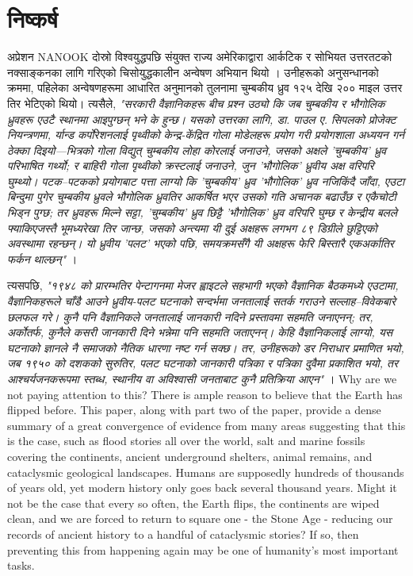 \documentclass[10pt,twocolumn,letterpaper]{article}
\begin{document}
\section{निष्कर्ष}

अप्रेशन NANOOK दोस्रो विश्वयुद्धपछि संयुक्त राज्य अमेरिकाद्वारा आर्कटिक र सोभियत उत्तरतटको नक्साङ्कनका लागि गरिएको चिसोयुद्धकालीन अन्वेषण अभियान थियो \cite{137}। उनीहरूको अनुसन्धानको क्रममा, पहिलेका अन्वेषणहरूमा आधारित अनुमानको तुलनामा चुम्बकीय ध्रुव १२५ देखि २०० माइल उत्तर तिर भेटिएको थियो। त्यसैले, \textit{"सरकारी वैज्ञानिकहरू बीच प्रश्न उठ्यो कि जब चुम्बकीय र भौगोलिक ध्रुवहरू एउटै स्थानमा आइपुग्छन् भने के हुन्छ। यसको उत्तरका लागि, डा. पाउल ए. सिपलको प्रोजेक्ट नियन्त्रणमा, र्यान्ड कर्पोरेशनलाई पृथ्वीको केन्द्र-केंद्रित गोला मोडेलहरू प्रयोग गरी प्रयोगशाला अध्ययन गर्न ठेक्का दिइयो—भित्रको गोला विद्युत् चुम्बकीय लोहा कोरलाई जनाउने, जसको अक्षले 'चुम्बकीय' ध्रुव परिभाषित गर्थ्यो; र बाहिरी गोला पृथ्वीको क्रस्टलाई जनाउने, जुन 'भौगोलिक' ध्रुवीय अक्ष वरिपरि घुम्थ्यो। पटक–पटकको प्रयोगबाट पत्ता लाग्यो कि 'चुम्बकीय' ध्रुव 'भौगोलिक' ध्रुव नजिकिंदै जाँदा, एउटा बिन्दुमा पुगेर चुम्बकीय ध्रुवले भौगोलिक ध्रुवतिर आकर्षित भएर उसको गति अचानक बढाउँछ र एकैचोटी भिड्न पुग्छ; तर ध्रुवहरू मिल्ने सट्टा, 'चुम्बकीय' ध्रुव छिट्टै 'भौगोलिक' ध्रुव वरिपरि घुम्छ र केन्द्रीय बलले फ्याकिएजस्तै भूमध्यरेखा तिर जान्छ, जसको अन्त्यमा यी दुई अक्षहरू लगभग ८९ डिग्रीले छुट्टिएको अवस्थामा रहन्छन्। यो ध्रुवीय 'पलट' भएको पछि, समयक्रमसँगै यी अक्षहरू फेरि बिस्तारै एकअर्कातिर फर्कन थाल्छन्"} \cite{138,139}।

त्यसपछि, \textit{"१९४८ को प्रारम्भतिर पेन्टागनमा मेजर ह्वाइटले सहभागी भएको वैज्ञानिक बैठकमध्ये एउटामा, वैज्ञानिकहरूले चाँडै आउने ध्रुवीय-पलट घटनाको सन्दर्भमा जनतालाई सतर्क गराउने सल्लाह–विवेकबारे छलफल गरे। कुनै पनि वैज्ञानिकले जनतालाई जानकारी नदिने प्रस्तावमा सहमति जनाएनन्; तर, अर्कोतर्फ, कुनैले कसरी जानकारी दिने भन्नेमा पनि सहमति जताएनन्। केहि वैज्ञानिकलाई लाग्यो, यस घटनाको ज्ञानले नै समाजको नैतिक धारणा नष्ट गर्न सक्छ। तर, उनीहरूको डर निराधार प्रमाणित भयो, जब १९५० को दशकको सुरुतिर, पलट घटनाको जानकारी पत्रिका र पत्रिका दुवैमा प्रकाशित भयो, तर आश्चर्यजनकरूपमा स्तब्ध, स्थानीय वा अविश्वासी जनताबाट कुनै प्रतिक्रिया आएन"} \cite{138,139}।
Why are we not paying attention to this? There is ample reason to believe that the Earth has flipped before. This paper, along with part two of the paper, provide a dense summary of a great convergence of evidence from many areas suggesting that this is the case, such as flood stories all over the world, salt and marine fossils covering the continents, ancient underground shelters, animal remains, and cataclysmic geological landscapes. Humans are supposedly hundreds of thousands of years old, yet modern history only goes back several thousand years. Might it not be the case that every so often, the Earth flips, the continents are wiped clean, and we are forced to return to square one - the Stone Age - reducing our records of ancient history to a handful of cataclysmic stories? If so, then preventing this from happening again may be one of humanity's most important tasks.
\end{document}
